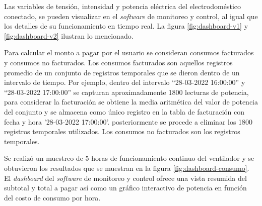 Las variables de tensión, intensidad y potencia eléctrica del electrodoméstico conectado, se pueden visualizar en el \emph{software} de monitoreo y control, al igual que los detalles de su funcionamiento en tiempo real. La figura \ref{fig:dashboard-v1} y \ref{fig:dashboard-v2} ilustran lo mencionado.

Para calcular el monto a pagar por el usuario se consideran consumos facturados y consumos no facturados. Los consumos facturados son aquellos registros promedio de un conjunto de registros temporales que se dieron dentro de un intervalo de tiempo. Por ejemplo, dentro del intervalo ``28-03-2022 16:00:00'' y ``28-03-2022 17:00:00'' se capturan aproximadamente 1800 lecturas de potencia, para considerar la facturación se obtiene la media aritmética del valor de potencia del conjunto y se almacena como único registro en la tabla de facturación con fecha y hora '28-03-2022 17:00:00'. posteriormente se procede a eliminar los 1800 registros temporales utilizados. Los consumos no facturados son los registros temporales. 


Se realizó un muestreo de 5 horas de funcionamiento continuo del ventilador y se obtuvieron los resultados que se muestran en la figura \ref{fig:dashboard-consumo}. El \emph{dashboard} del \emph{software} de monitoreo y control ofrece una vista resumida del subtotal y total a pagar así como un gráfico interactivo de potencia en función del costo de consumo por hora.

